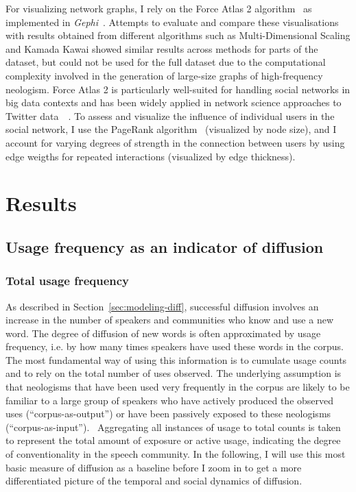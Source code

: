 \documentclass[
  a4paper,
  abstract=on,
  captions=tableabove
  ]{scrartcl}
\begin{document}
  For visualizing network graphs, I rely on the Force Atlas 2 algorithm~\parencite{Jacomy2014ForceAtlas2Continuous} as implemented in \emph{Gephi}~\parencite{Bastian2009GephiOpen}. Attempts to evaluate and compare these visualisations with results obtained from different algorithms such as Multi-Dimensional Scaling and Kamada Kawai showed similar results across methods for parts of the dataset, but could not be used for the full dataset due to the computational complexity involved in the generation of large-size graphs of high-frequency neologism. Force Atlas 2 is particularly well-suited for handling social networks in big data contexts and has been widely applied in network science approaches to Twitter data~ \parencite{Bruns2012HowLong,Gerlitz2013MiningOne,Bliss2012TwitterReciprocal}. To assess and visualize the influence of individual users in the social network, I use the PageRank algorithm~\parencite{Brin1998AnatomyLargeScale} (visualized by node size), and I account for varying degrees of strength in the connection between users by using edge weigths for repeated interactions (visualized by edge thickness).

\section{Results}
  \label{sec:results}

  \subsection{Usage frequency as an indicator of diffusion}
    \label{subsec:freq}

    \subsubsection{Total usage frequency}
      \label{subsec:total-freq}

      As described in Section~\ref{sec:modeling-diff}, successful diffusion involves an increase in the number of speakers and communities who know and use a new word. The degree of diffusion of new words is often approximated by usage frequency, i.e. by how many times speakers have used these words in the corpus. The most fundamental way of using this information is to cumulate usage counts and to rely on the total number of uses observed. The underlying assumption is that neologisms that have been used very frequently in the corpus are likely to be familiar to a large group of speakers who have actively produced the observed uses (\enquote{corpus-as-output}) or have been passively exposed to these neologisms (\enquote{corpus-as-input}).~\parencite{Stefanowitsch2017CorpusbasedPerspective} Aggregating all instances of usage to total counts is taken to represent the total amount of exposure or active usage, indicating the degree of conventionality in the speech community. In the following, I will use this most basic measure of diffusion as a baseline before I zoom in to get a more differentiated picture of the temporal and social dynamics of diffusion.
\end{document}
